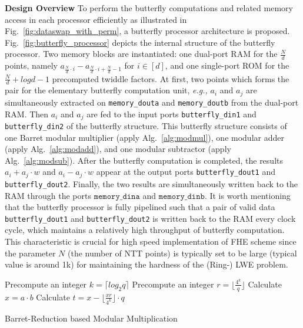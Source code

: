 \documentclass{iacrtrans}
\theoremstyle{plain}
\begin{document}
\textbf{Design Overview} To perform the butterfly computations and related memory access in each processor efficiently as illustrated in Fig.~\ref{fig:dataswap_with_perm}, a butterfly processor architecture is proposed. Fig.~\ref{fig:butterfly_processor} depicts the internal structure of the butterfly processor. Two memory blocks are instantiated: one dual-port RAM for the $\frac{N}{d}$ points, namely $a_{\frac{N}{d}\cdot i}-a_{\frac{N}{d}\cdot i+\frac{N}{d}-1}$ for $i\in [d]$,
and one single-port ROM for the $\frac{N}{d}+logd-1$ precomputed twiddle factors. At first, two points which forms the pair for the elementary butterfly computation unit, \textit{e.g.,} $a_i$ and $a_j$ are simultaneously extracted on \texttt{memory\_douta} and \texttt{memory\_doutb} from the dual-port RAM. Then $a_i$ and $a_j$ are fed to the input ports \texttt{butterfly\_din1} and \texttt{butterfly\_din2} of the butterfly structure. This butterfly structure consists of one Barret modular multiplier (apply Alg.~\ref{alg:modmul}), one modular adder (apply Alg.~\ref{alg:modadd}), and one modular subtractor (apply Alg.~\ref{alg:modsub}). After the butterfly computation is completed, the results $a_i+a_j\cdot w$ and $a_i-a_j\cdot w$ appear at the output ports \texttt{butterfly\_dout1} and \texttt{butterfly\_dout2}. Finally, the two results are simultaneously written back to the RAM through the ports $\texttt{memory\_dina}$ and $\texttt{memory\_dinb}$. It is worth mentioning that
the butterfly processor is fully pipelined such that a pair of valid data \texttt{butterfly\_dout1} and \texttt{butterfly\_dout2} is written back to the RAM every clock cycle, which maintains a relatively high throughput of butterfly computation. This characteristic is crucial for high speed implementation of FHE scheme since the parameter $N$ (the number of NTT points) is typically set to be large (typical value is around 1k) for maintaining the hardness of the (Ring-) LWE problem.  


\begin{algorithm}[!tbh]
 \DontPrintSemicolon %
    Precompute an integer $k=\lceil log_2q\rceil$\;
    Precompute an integer $r=\lfloor \frac{4^k}{q}\rfloor$\;
    Calculate $x=a\cdot b$\;
    Calculate $t = x - \lfloor\frac{xr}{4^k}\rfloor\cdot q$\;
     
    
 \caption{Barret-Reduction based Modular Multiplication}\label{alg:modmul}
\end{algorithm}
\end{document}
